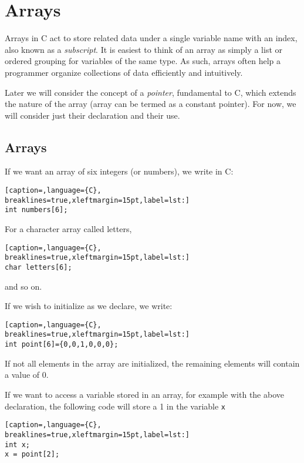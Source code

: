 \section{Arrays}
Arrays in C act to store related data under a single variable name with an
index, also known as a \emph{subscript}. It is easiest to think of an array as
simply a list or ordered grouping for variables of the same type. As such,
arrays often help a programmer organize collections of data efficiently and
intuitively.

Later we will consider the concept of a \emph{pointer}, fundamental to C, which
extends the nature of the array (array can be termed as a constant pointer).
For now, we will consider just their declaration and their use.

\subsection{Arrays}
If we want an array of six integers (or numbers), we write in C:
\lstset{basicstyle=\scriptsize, numbers=left, captionpos=b, tabsize=4}
\begin{lstlisting}[caption=,language={C},
breaklines=true,xleftmargin=15pt,label=lst:]
int numbers[6];
\end{lstlisting}

For a character array called letters,
\lstset{basicstyle=\scriptsize, numbers=left, captionpos=b, tabsize=4}
\begin{lstlisting}[caption=,language={C},
breaklines=true,xleftmargin=15pt,label=lst:]
char letters[6];
\end{lstlisting}

and so on.

If we wish to initialize as we declare, we write:
\lstset{basicstyle=\scriptsize, numbers=left, captionpos=b, tabsize=4}
\begin{lstlisting}[caption=,language={C},
breaklines=true,xleftmargin=15pt,label=lst:]
int point[6]={0,0,1,0,0,0};
\end{lstlisting}

If not all elements in the array are initialized, the remaining elements will
contain a value of 0.

If we want to access a variable stored in an array, for example with the above
declaration, the following code will store a 1 in the variable \texttt{x}
\lstset{basicstyle=\scriptsize, numbers=left, captionpos=b, tabsize=4}
\begin{lstlisting}[caption=,language={C},
breaklines=true,xleftmargin=15pt,label=lst:]
int x;
x = point[2];
\end{lstlisting}

